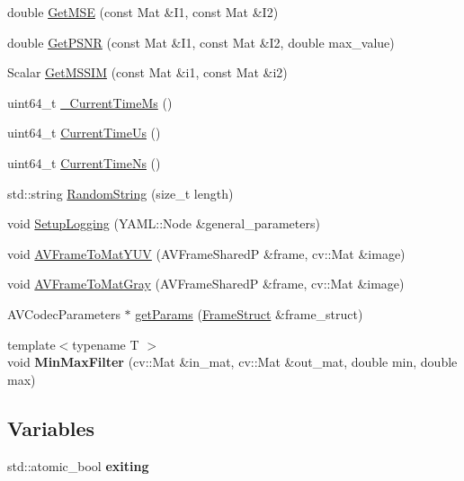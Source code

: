 \begin{DoxyCompactItemize}
\item 
double \hyperlink{namespacemoetsi_1_1ssp_a3c49338af0ef5d208a34718fe29fc693}{Get\+M\+SE} (const Mat \&I1, const Mat \&I2)
\item 
double \hyperlink{namespacemoetsi_1_1ssp_a0290f5110cb2cd2c9327c2fa6a528c84}{Get\+P\+S\+NR} (const Mat \&I1, const Mat \&I2, double max\+\_\+value)
\item 
Scalar \hyperlink{namespacemoetsi_1_1ssp_ae44d43d11d27495335b5494d0cff7601}{Get\+M\+S\+S\+IM} (const Mat \&i1, const Mat \&i2)
\item 
uint64\+\_\+t \hyperlink{namespacemoetsi_1_1ssp_a2e6df4e4be7651adce19778f4efb5de0}{\+\_\+\+Current\+Time\+Ms} ()
\item 
uint64\+\_\+t \hyperlink{namespacemoetsi_1_1ssp_ad7107897c233642c927f0129f2aea2e0}{Current\+Time\+Us} ()
\item 
uint64\+\_\+t \hyperlink{namespacemoetsi_1_1ssp_ae09a8f6b1d89b0bdb6eec602dd581192}{Current\+Time\+Ns} ()
\item 
std\+::string \hyperlink{namespacemoetsi_1_1ssp_ac615e71e018ead7a1598be1b67079f93}{Random\+String} (size\+\_\+t length)
\item 
void \hyperlink{namespacemoetsi_1_1ssp_a732d178071710fdceab189671f2d7c25}{Setup\+Logging} (Y\+A\+M\+L\+::\+Node \&general\+\_\+parameters)
\item 
void \hyperlink{namespacemoetsi_1_1ssp_a82e9b74b4a9a35255cc5d4ff66dc776f}{A\+V\+Frame\+To\+Mat\+Y\+UV} (A\+V\+Frame\+SharedP \&frame, cv\+::\+Mat \&image)
\item 
void \hyperlink{namespacemoetsi_1_1ssp_a028ac1fd9c21f63f40dfa1131c589ad5}{A\+V\+Frame\+To\+Mat\+Gray} (A\+V\+Frame\+SharedP \&frame, cv\+::\+Mat \&image)
\item 
A\+V\+Codec\+Parameters $\ast$ \hyperlink{namespacemoetsi_1_1ssp_a2d7925d2be7b96068b314ec08c673df6}{get\+Params} (\hyperlink{structmoetsi_1_1ssp_1_1FrameStruct}{Frame\+Struct} \&frame\+\_\+struct)
\item 
\mbox{\label{namespacemoetsi_1_1ssp_ac6e1b3e0caadb02f6e5a8387e6fee988}} 
{\footnotesize template$<$typename T $>$ }\\void {\bfseries Min\+Max\+Filter} (cv\+::\+Mat \&in\+\_\+mat, cv\+::\+Mat \&out\+\_\+mat, double min, double max)
\end{DoxyCompactItemize}
\subsection*{Variables}
\begin{DoxyCompactItemize}
\item 
\mbox{\label{namespacemoetsi_1_1ssp_a998f3ec3680c51d19383e0f6e38e48c2}} 
std\+::atomic\+\_\+bool {\bfseries exiting}
\end{DoxyCompactItemize}



